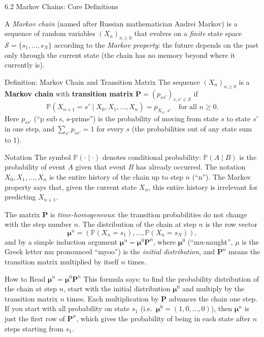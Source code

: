 \documentclass[aspectratio=169,10pt]{beamer}
\newcommand{\PP}{\mathbb{P}}
\newcommand{\bfP}{\mathbf{P}}
\newcommand{\bfmu}{\bm{\mu}}
\begin{document}
\begin{frame}[allowframebreaks]{6.2 Markov Chains: Core Definitions}

A \emph{Markov chain} (named after Russian mathematician Andrei Markov) is a sequence of random variables $(X_n)_{n \ge 0}$ that evolves on a \emph{finite} state space $\mathcal{S} = \{s_1, \ldots, s_N\}$ according to the \emph{Markov property}: the future depends on the past only through the current state (the chain has no memory beyond where it currently is).

\begin{block}{Definition: Markov Chain and Transition Matrix}
The sequence $(X_n)_{n \ge 0}$ is a \textbf{Markov chain} with \textbf{transition matrix} $\bfP = (p_{ss'})_{s,s' \in \mathcal{S}}$ if
\[
  \PP(X_{n+1} = s' \mid X_0, X_1, \ldots, X_n) = p_{X_n,\, s'} \quad \text{for all } n \ge 0.
\]
Here $p_{ss'}$ (``p sub s, s-prime'') is the probability of moving from state $s$ to state $s'$ in one step, and $\sum_{s'} p_{ss'} = 1$ for every $s$ (the probabilities out of any state sum to 1).
\end{block}

\begin{block}{Notation}
The symbol $\PP(\cdot \mid \cdot)$ denotes conditional probability: $\PP(A \mid B)$ is the probability of event $A$ given that event $B$ has already occurred.
The notation $X_0, X_1, \ldots, X_n$ is the entire history of the chain up to step $n$ (``n'').
The Markov property says that, given the current state $X_n$, this entire history is irrelevant for predicting $X_{n+1}$.
\end{block}

\framebreak

The matrix $\bfP$ is \emph{time-homogeneous}: the transition probabilities do not change with the step number $n$.
The distribution of the chain at step $n$ is the row vector
\[
  \bfmu^n = (\PP(X_n = s_1), \ldots, \PP(X_n = s_N)),
\]
and by a simple induction argument $\bfmu^n = \bfmu^0 \bfP^n$, where $\bfmu^0$ (``mu-naught'', $\mu$ is the Greek letter mu pronounced ``myoo'') is the \emph{initial distribution}, and $\bfP^n$ means the transition matrix multiplied by itself $n$ times.

\begin{alertblock}{How to Read $\bfmu^n = \bfmu^0 \bfP^n$}
This formula says: to find the probability distribution of the chain at step $n$, start with the initial distribution $\bfmu^0$ and multiply by the transition matrix $n$ times.
Each multiplication by $\bfP$ advances the chain one step.
If you start with all probability on state $s_1$ (i.e.\ $\bfmu^0 = (1, 0, \ldots, 0)$), then $\bfmu^n$ is just the first row of $\bfP^n$, which gives the probability of being in each state after $n$ steps starting from $s_1$.
\end{alertblock}


\end{frame}
\end{document}
